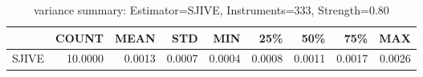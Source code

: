 \begin{table}[ht]
\centering
\caption{variance summary: Estimator=SJIVE, Instruments=333, Strength=0.80}
\begin{tabular}{lrrrrrrrr}
\toprule
 & COUNT & MEAN & STD & MIN & 25\% & 50\% & 75\% & MAX \\
\midrule
SJIVE & 10.0000 & 0.0013 & 0.0007 & 0.0004 & 0.0008 & 0.0011 & 0.0017 & 0.0026 \\
\bottomrule
\end{tabular}
\end{table}
